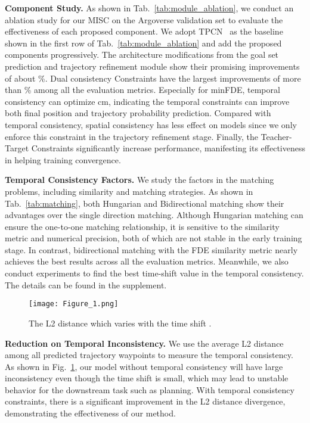 \documentclass[10pt,twocolumn,letterpaper]{article}
\begin{document}
\noindent\textbf{Component Study.} As shown in Tab.~\ref{tab:module_ablation}, we conduct an ablation study for our MISC on the Argoverse validation set to evaluate the effectiveness of each proposed component. We adopt TPCN~\cite{ye2021tpcn} as the baseline shown in the first row of Tab.~\ref{tab:module_ablation} and add the proposed components progressively. The architecture modifications from the goal set prediction and trajectory refinement module show their promising improvements of about \%. Dual consistency Constraints have the largest improvements of more than \% among all the evaluation metrics. Especially for minFDE, temporal consistency can optimize  cm, indicating the temporal constraints can improve both final position and trajectory probability prediction. Compared with temporal consistency, spatial consistency has less effect on models since we only enforce this constraint in the trajectory refinement stage. Finally, the Teacher-Target Constraints significantly increase performance, manifesting its effectiveness in helping training convergence.   








\noindent\textbf{Temporal Consistency Factors.} 
We study the factors in the matching problems, including similarity and matching strategies. As shown in Tab.~\ref{tab:matching}, both Hungarian and Bidirectional matching show their advantages over the single direction matching. Although Hungarian matching can ensure the one-to-one matching relationship, it is sensitive to the similarity metric and numerical precision, both of which are not stable in the early training stage. In contrast, bidirectional matching with the FDE similarity metric nearly achieves the best results across all the evaluation metrics. Meanwhile, we also conduct experiments to find the best time-shift value  in the temporal consistency. The details can be found in the supplement.


\begin{figure}
    \centering
    \texttt{[image: Figure\_1.png]}
    \caption{The L2 distance which varies with the time shift .}
    \label{fig:consistency}
\end{figure}

\noindent\textbf{Reduction on Temporal Inconsistency.} We use the average L2 distance among all predicted trajectory waypoints to measure the temporal consistency. As shown in Fig.~\ref{fig:consistency}, our model without temporal consistency will have large inconsistency even though the time shift  is small, which may lead to unstable behavior for the downstream task such as planning. With temporal consistency constraints, there is a significant improvement in the L2 distance divergence, demonstrating the effectiveness of our method. 
\end{document}
